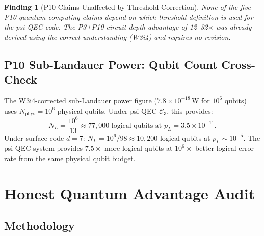 \documentclass[11pt]{article}
\newtheorem{finding}[theorem]{Finding}
\theoremstyle{definition}
\theoremstyle{remark}
\begin{document}
\begin{finding}[P10 Claims Unaffected by Threshold Correction]
\label{finding:p10-unaffected}
None of the five P10 quantum computing claims depend on which threshold
definition is used for the psi-QEC code.  The P3+P10 circuit depth
advantage of 12--32$\times$ was already derived using the correct
understanding (W3i4) and requires no revision.
\end{finding}

\subsection{P10 Sub-Landauer Power: Qubit Count Cross-Check}
\label{sec:p10-sublaudauer}

The W3i4-corrected sub-Landauer power figure ($7.8\times10^{-18}$\,W for
$10^6$ qubits) uses $N_{\mathrm{phys}} = 10^6$ physical qubits.  Under
psi-QEC $\mathcal{C}_3$, this provides:
\begin{equation}
  N_L = \frac{10^6}{13} \approx 77{,}000 \text{ logical qubits at }
  p_L = 3.5\times10^{-11}.
\end{equation}
Under surface code $d=7$: $N_L = 10^6/98 \approx 10{,}200$ logical qubits
at $p_L \sim 10^{-5}$.  The psi-QEC system provides $7.5\times$ more logical
qubits at $10^6\times$ better logical error rate from the same physical
qubit budget.

\section{Honest Quantum Advantage Audit}
\label{sec:honest-audit}

\subsection{Methodology}
\label{sec:audit-method}
\end{document}
